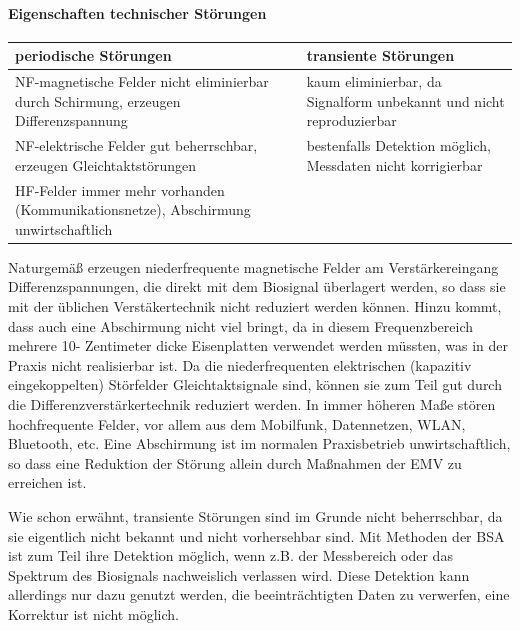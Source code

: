 \documentclass[a4paper]{article}
\begin{document}
\begin{multicols}{3}
  \paragraph{Eigenschaften technischer Störungen}\label{eigenschaften-technischer-stuxf6rungen}

  \begin{tabular}{l|l}
    periodische Störungen                                                                & transiente Störungen                                                \\\hline
    NF-magnetische Felder nicht eliminierbar durch Schirmung, erzeugen Differenzspannung & kaum eliminierbar, da Signalform unbekannt und nicht reproduzierbar \\
    NF-elektrische Felder gut beherrschbar, erzeugen Gleichtaktstörungen                 & bestenfalls Detektion möglich, Messdaten nicht korrigierbar         \\
    HF-Felder immer mehr vorhanden (Kommunikationsnetze), Abschirmung unwirtschaftlich   &                                                                     \\
  \end{tabular}

  \begin{enumerate*}
    \def\labelenumi{\arabic{enumi}.}
    \item Naturgemäß erzeugen niederfrequente magnetische Felder am Verstärkereingang Differenzspannungen, die direkt mit dem Biosignal überlagert werden, so dass sie mit der üblichen Verstäkertechnik nicht reduziert werden können. Hinzu kommt, dass auch eine Abschirmung nicht viel bringt, da in diesem Frequenzbereich mehrere 10- Zentimeter dicke Eisenplatten verwendet werden müssten, was in der Praxis nicht realisierbar ist. Da die niederfrequenten elektrischen (kapazitiv eingekoppelten) Störfelder Gleichtaktsignale sind, können sie zum Teil gut durch die Differenzverstärkertechnik reduziert werden. In immer höheren Maße stören hochfrequente Felder, vor allem aus dem Mobilfunk, Datennetzen, WLAN, Bluetooth, etc. Eine Abschirmung ist im normalen Praxisbetrieb unwirtschaftlich, so dass eine Reduktion der Störung allein durch Maßnahmen der EMV zu erreichen ist.
    \item Wie schon erwähnt, transiente Störungen sind im Grunde nicht beherrschbar, da sie eigentlich nicht bekannt und nicht vorhersehbar sind. Mit Methoden der BSA ist zum Teil ihre Detektion möglich, wenn z.B. der Messbereich oder das Spektrum des Biosignals nachweislich verlassen wird. Diese Detektion kann allerdings nur dazu genutzt werden, die beeinträchtigten Daten zu verwerfen, eine Korrektur ist nicht möglich.
  \end{enumerate*}


\end{multicols}
\end{document}
